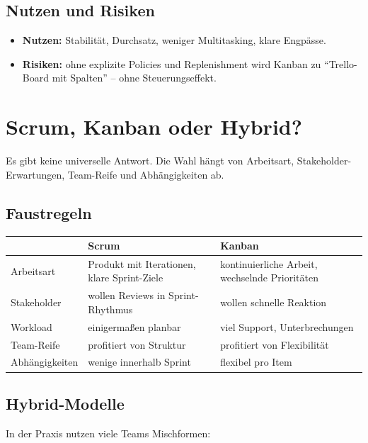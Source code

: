 \documentclass[11pt,a4paper,oneside]{article}
\begin{document}
\subsection{Nutzen und Risiken}

\begin{itemize}
  \item \textbf{Nutzen:} Stabilität, Durchsatz, weniger Multitasking, klare Engpässe.
  \item \textbf{Risiken:} ohne explizite Policies und Replenishment wird Kanban zu ``Trello-Board mit Spalten'' -- ohne Steuerungseffekt.
\end{itemize}

\section{Scrum, Kanban oder Hybrid?}

Es gibt keine universelle Antwort. Die Wahl hängt von Arbeitsart, Stakeholder-Erwartungen, Team-Reife und Abhängigkeiten ab.

\subsection{Faustregeln}

\begin{tabularx}{\linewidth}{@{}lXX@{}}
\toprule
& \textbf{Scrum} & \textbf{Kanban} \\
\midrule
Arbeitsart & Produkt mit Iterationen, klare Sprint-Ziele & kontinuierliche Arbeit, wechselnde Prioritäten \\
Stakeholder & wollen Reviews in Sprint-Rhythmus & wollen schnelle Reaktion \\
Workload & einigermaßen planbar & viel Support, Unterbrechungen \\
Team-Reife & profitiert von Struktur & profitiert von Flexibilität \\
Abhängigkeiten & wenige innerhalb Sprint & flexibel pro Item \\
\bottomrule
\end{tabularx}

\medskip

\subsection{Hybrid-Modelle}

In der Praxis nutzen viele Teams Mischformen:
\end{document}
